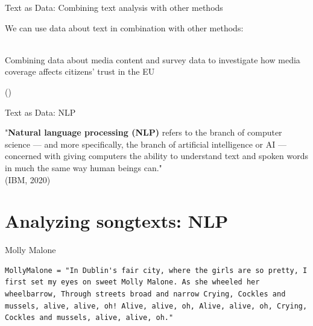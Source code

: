 \documentclass[handout]{beamer}
\begin{document}
\begin{frame}{Text as Data: \small{Combining text analysis with other methods}}
	
	We can use data about text in combination with other methods: \\~
	
	Combining data about media content and survey data to investigate how media coverage affects citizens' trust in the EU \\
	\begin{tiny}
		(\cite{brosius_trust_2019}) \\
	\end{tiny}
	
	

	
\end{frame}


\begin{frame}{Text as Data: NLP}
	
	"\textbf{Natural language processing (NLP)} refers to the branch of computer science — and more specifically, the branch of artificial intelligence or AI — concerned with giving computers the ability to understand text and spoken words in much the same way human beings can."  \\
	\tiny{(IBM, 2020)}
	
	
	
\end{frame}





\section{Analyzing songtexts: NLP}

\begin{frame}[fragile]{Molly Malone}
	
\begin{lstlisting} 
MollyMalone = "In Dublin's fair city, where the girls are so pretty, I first set my eyes on sweet Molly Malone. As she wheeled her wheelbarrow, Through streets broad and narrow Crying, Cockles and mussels, alive, alive, oh! Alive, alive, oh, Alive, alive, oh, Crying, Cockles and mussels, alive, alive, oh."  
\end{lstlisting}
	


\end{frame}
\end{document}
